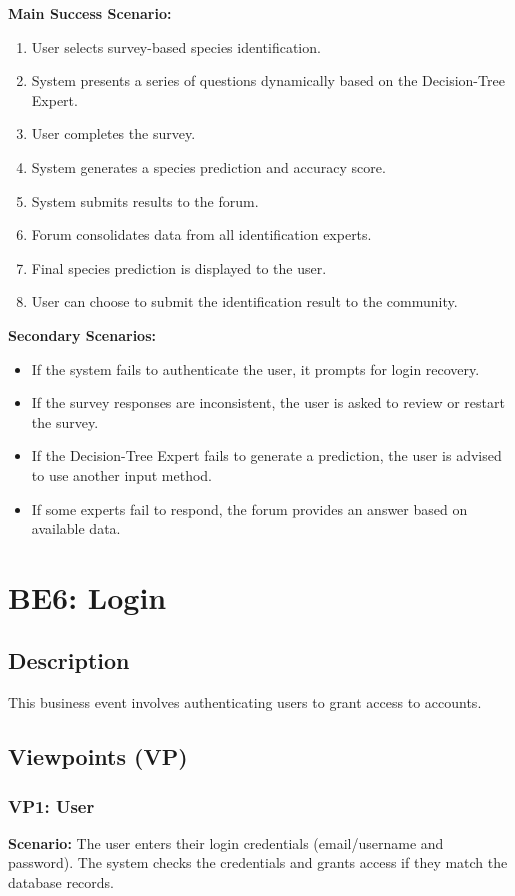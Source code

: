 \documentclass[]{article}
\begin{document}
\begin{enumerate}[{\bf BE1.}]
\textbf{Main Success Scenario:}
\begin{enumerate}
    \item User selects survey-based species identification.
    \item System presents a series of questions dynamically based on the Decision-Tree Expert.
    \item User completes the survey.
    \item System generates a species prediction and accuracy score.
    \item System submits results to the forum.
    \item Forum consolidates data from all identification experts.
    \item Final species prediction is displayed to the user.
    \item User can choose to submit the identification result to the community.
\end{enumerate}

\textbf{Secondary Scenarios:}
\begin{itemize}
    \item If the system fails to authenticate the user, it prompts for login recovery.
    \item If the survey responses are inconsistent, the user is asked to review or restart the survey.
    \item If the Decision-Tree Expert fails to generate a prediction, the user is advised to use another input method.
    \item If some experts fail to respond, the forum provides an answer based on available data.
\end{itemize}
\section*{BE6: Login}

\subsection*{Description}
This business event involves authenticating users to grant access to accounts.

\subsection*{Viewpoints (VP)}

\subsubsection*{VP1: User}
\textbf{Scenario:} The user enters their login credentials (email/username and password). The system checks the credentials and grants access if they match the database records.


\end{enumerate}
\end{document}
